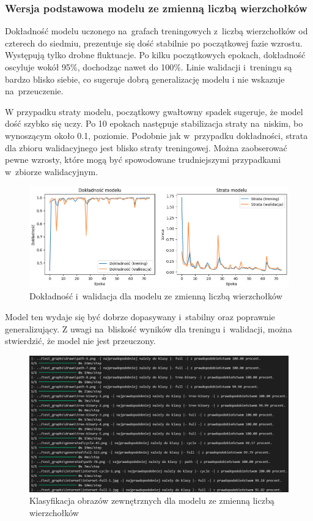 \subsubsection{Wersja podstawowa modelu ze zmienną liczbą wierzchołków}

Dokładność modelu uczonego na~grafach treningowych z~liczbą wierzchołków od czterech do siedmiu,
prezentuje się dość stabilnie po początkowej fazie wzrostu. Występują tylko drobne fluktuacje.
Po kilku początkowych epokach, dokładność oscyluje wokół 95\%, dochodząc nawet do 100\%.
Linie walidacji i~treningu są bardzo blisko siebie, co sugeruje dobrą generalizację modelu
i nie wskazuje na~przeuczenie.

W przypadku straty modelu, początkowy gwałtowny spadek sugeruje, że model dość szybko się uczy.
Po 10 epokach następuje stabilizacja straty na~niskim, bo wynoszącym około 0.1, poziomie.
Podobnie jak w~przypadku dokładności, strata dla zbioru walidacyjnego jest blisko straty treningowej.
Można zaobserować pewne wzrosty, które mogą być spowodowane trudniejszymi przypadkami w~zbiorze walidacyjnym.

\begin{figure}[ht]
	\centering
	\includegraphics[width=15.5cm]{resources/tests/images/v3/multiple_edges_img.png}
	\caption{Dokładność i~walidacja dla modelu ze zmienną liczbą wierzchołków}
	\label{Fig:tests-var-0a}
\end{figure}
\FloatBarrier

Model ten wydaje się być dobrze dopasywany i~stabilny oraz poprawnie generalizujący.
Z uwagi na~bliskość wyników dla treningu i~walidacji, można stwierdzić, że model nie jest przeuczony.

\begin{figure}[ht]
	\centering
	\includegraphics[width=15.5cm]{resources/tests/images/v3/multiple_edges_txt.png}
	\caption{Klasyfikacja obrazów zewnętrznych dla modelu ze zmienną liczbą wierzchołków}
	\label{Fig:tests-var-0b}
\end{figure}
\FloatBarrier

